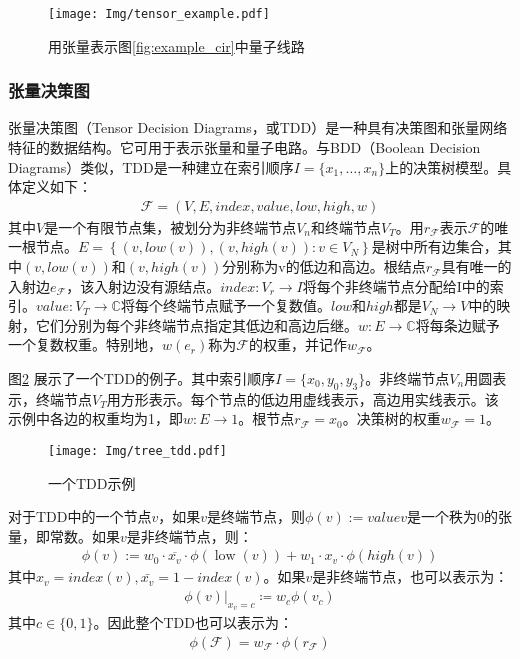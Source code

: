 \begin{figure}[!htbp]
    \centering
    \texttt{[image: Img/tensor\_example.pdf]}
    \caption{用张量表示图\ref{fig:example_cir}中量子线路}   
    \label{fig:example_cir_map}
\end{figure}

\subsubsection{张量决策图}
张量决策图（Tensor Decision Diagrams，或TDD）是一种具有决策图和张量网络特征的数据结构\citep{Hong_2022}。它可用于表示张量和量子电路。与BDD（Boolean Decision Diagrams）类似，TDD是一种建立在索引顺序$I=\{x_1,\ldots,x_n\}$上的决策树模型。具体定义如下：
\begin{align}
    \mathcal{F}=\left(V,E,index,value,low,high,w\right)
\end{align}
其中$V$是一个有限节点集，被划分为非终端节点$V_n$和终端节点$V_T$。用$r_{\mathcal{F}}$表示$\mathcal{F}$的唯一根节点。$E=\left\{\left(v,low\left(v\right)\right),\left(v,high\left(v\right)\right):v\in V_N\right\}$是树中所有边集合，其中$\left(v,low\left(v\right)\right)$和$\left(v,high\left(v\right)\right)$分别称为v的低边和高边。根结点$r_{\mathcal{F}}$具有唯一的入射边$e_{\mathcal{F}}$，该入射边没有源结点。$index:V_r\rightarrow I$将每个非终端节点分配给I中的索引。$value:V_T\rightarrow\mathbb{C}$将每个终端节点赋予一个复数值。$low$和$high$都是$V_N\rightarrow V$中的映射，它们分别为每个非终端节点指定其低边和高边后继。$w:E\rightarrow\mathbb{C}$将每条边赋予一个复数权重。特别地，$w\left(e_r\right)$称为$\mathcal{F}$的权重，并记作$w_{\mathcal{F}}$。 



图\ref{fig:tdd_ex} 展示了一个TDD的例子。其中索引顺序$I=\{x_0,y_0,y_3\}$。非终端节点$V_n$用圆表示，终端节点$V_T$用方形表示。每个节点的低边用虚线表示，高边用实线表示。该示例中各边的权重均为1，即$w:E\rightarrow 1$。根节点$r_{\mathcal{F}}=x_0$。决策树的权重$w_{\mathcal{F}}=1$。
\begin{figure}[!htbp]
    \centering
    \texttt{[image: Img/tree\_tdd.pdf]}
    \caption{一个TDD示例}   
    \label{fig:tdd_ex}
\end{figure}

对于TDD中的一个节点$v$，如果$v$是终端节点，则$\phi\left(v\right):= valuev$是一个秩为$0$的张量，即常数。如果$v$是非终端节点，则：
\begin{align}
    \phi(v):=w_{0} \cdot \overline{x_{v}} \cdot \phi(\operatorname{low}(v))+w_{1} \cdot x_{v} \cdot \phi(h i g h(v))
\end{align}
其中$x_v=index\left(v\right),\bar{x_v}=1-index\left(v\right)$。如果$v$是非终端节点，也可以表示为：
\begin{align}
    \left.\phi\left(v\right)\right|_{x_v=c}≔w_c \phi (v_c)
\end{align}
其中$c\in\{0,1\}$。因此整个TDD也可以表示为：
\begin{align}
    \phi\left(\mathcal{F}\right)=w_{\mathcal{F}}\cdot\phi\left(r_{\mathcal{F}}\right)
\end{align}
